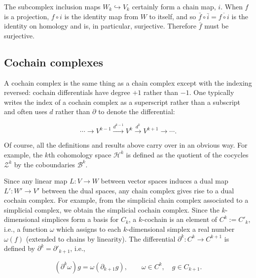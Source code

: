 \begin{Proof}
{The subcomplex inclusion maps $W_k\hookrightarrow V_k$ certainly form a chain map, $i$. When $f$ is a projection, $f\circ i$ is the identity map from $W$ to itself, and so $\bar f\circ\bar i=\overline{f\circ i}$ is the identity on homology and is, in particular, surjective. Therefore $\bar f$ must be surjective.}
\end{Proof}

\subsection{{Cochain complexes}}\label{sec:cochain-complexes}

{A cochain complex is the same thing as a chain complex except with the indexing reversed: cochain differentials have degree $+1$ rather than $-1$. One typically writes the index of a cochain complex as a superscript rather than a subscript and often uses $d$ rather than $\partial$ to denote the differential:}

\[
\cdots\to V^{k-1}\xrightarrow{d^{k-1}}V^k\xrightarrow{d^k}V^{k+1}\to\cdots.
\]

{Of course, all the definitions and results above carry over in an obvious way. For example, the $k$th cohomology space $\mathcal H^k$ is defined as the quotient of the cocycles $\mathcal Z^k$ by the coboundaries $\mathcal B^k$.}

{Since any linear map $L:V\to W$ between vector spaces induces a dual map $L':W'\to V'$ between the dual spaces, any chain complex gives rise to a dual cochain complex. For example, from the simplicial chain complex associated to a simplicial complex, we obtain the simplicial cochain complex. Since the $k$-dimensional simplices form a basis for $C_k$, a $k$-cochain is an element of $C^k:=C'_k$, i.e., a function $\omega$ which assigns to each $k$-dimensional simplex a real number $\omega(f)$ (extended to chains by linearity). The differential $\partial^k:C^k\to C^{k+1}$ is defined by $\partial^k=\partial'_{k+1}$, i.e.,}

\[
(\partial^k\omega)g=\omega(\partial_{k+1}g),\qquad \omega\in C^k,\quad g\in C_{k+1}.
\]

